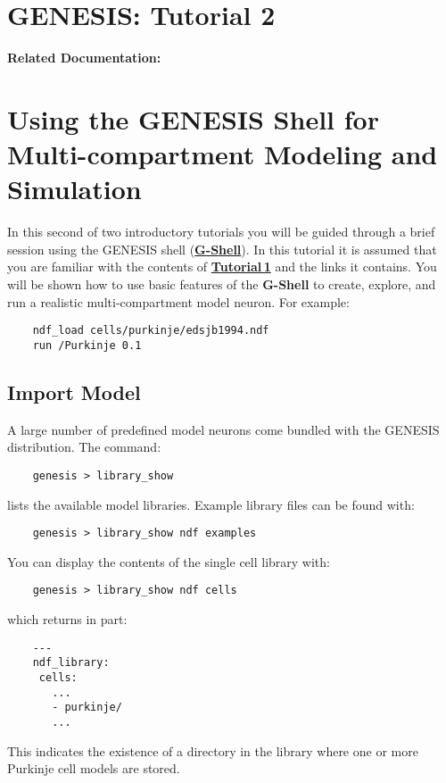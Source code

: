 \documentclass[12pt]{article}
\begin{document}
\section*{GENESIS: Tutorial 2}

{\bf Related Documentation:}

\section*{Using the GENESIS Shell for\\Multi-compartment Modeling and Simulation}

In this second of two introductory tutorials you will be guided through a brief session using the GENESIS shell (\href{../gshell/gshell.tex}{\bf G-Shell}). In this tutorial it is assumed that you are familiar with the contents of \href{../tutorial1/tutorial1.tex}{\bf Tutorial\,1} and the links it contains. You will be shown how to use basic features of the {\bf G-Shell} to create, explore, and run a realistic multi-compartment model neuron. For example:
\begin{verbatim}
    ndf_load cells/purkinje/edsjb1994.ndf
    run /Purkinje 0.1
\end{verbatim}

\subsection*{Import Model}

A large number of predefined model neurons come bundled with the GENESIS distribution. The command:
\begin{verbatim}
    genesis > library_show
\end{verbatim}
lists the available model libraries. Example library files can be found with:
\begin{verbatim}
    genesis > library_show ndf examples
\end{verbatim}
You can display the contents of the single cell library with:
\begin{verbatim}
    genesis > library_show ndf cells
\end{verbatim}
which returns in part:
\begin{verbatim}
    ---
    ndf_library:
     cells:
       ...
       - purkinje/
       ...
\end{verbatim}
This indicates the existence of a directory in the library where one or more Purkinje cell models are stored.
\end{document}
